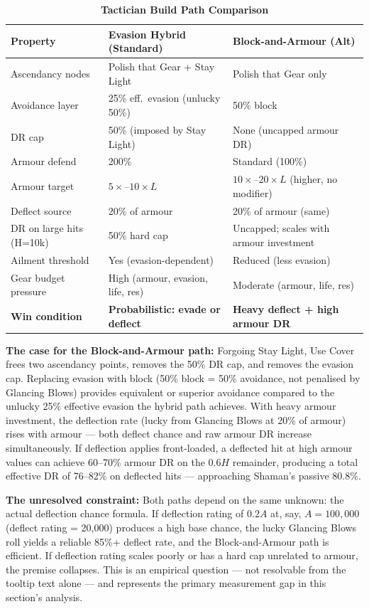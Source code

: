 \documentclass[12pt, letterpaper]{article}
\begin{document}
\begin{table}[htbp]
\centering
\caption{\textbf{Tactician Build Path Comparison}}
\begin{tabular}{lll}
\toprule
\textbf{Property} & \textbf{Evasion Hybrid (Standard)} & \textbf{Block-and-Armour (Alt)} \\
\midrule
\rowcolor{rowalt} Ascendancy nodes & Polish that Gear + Stay Light & Polish that Gear only \\
Avoidance layer & 25\% eff.\ evasion (unlucky 50\%) & 50\% block \\
\rowcolor{rowalt} DR cap & 50\% (imposed by Stay Light) & None (uncapped armour DR) \\
Armour defend & 200\% & Standard (100\%) \\
\rowcolor{rowalt} Armour target & $5\times$--$10\times L$ & $10\times$--$20\times L$ (higher, no modifier) \\
Deflect source & 20\% of armour & 20\% of armour (same) \\
\rowcolor{rowalt} DR on large hits (H=10k) & 50\% hard cap & Uncapped; scales with armour investment \\
Ailment threshold & Yes (evasion-dependent) & Reduced (less evasion) \\
\rowcolor{rowalt} Gear budget pressure & High (armour, evasion, life, res) & Moderate (armour, life, res) \\
\rowcolor{rowhi} \textbf{Win condition} & \textbf{Probabilistic: evade or deflect} & \textbf{Heavy deflect + high armour DR} \\
\bottomrule
\end{tabular}
\end{table}

\textbf{The case for the Block-and-Armour path:} Forgoing Stay Light, Use Cover frees two ascendancy points, removes the 50\% DR cap, and removes the evasion cap. Replacing evasion with block (50\% block = 50\% avoidance, not penalised by Glancing Blows) provides equivalent or superior avoidance compared to the unlucky 25\% effective evasion the hybrid path achieves. With heavy armour investment, the deflection rate (lucky from Glancing Blows at 20\% of armour) rises with armour --- both deflect chance and raw armour DR increase simultaneously. If deflection applies front-loaded, a deflected hit at high armour values can achieve 60--70\% armour DR on the 0.6$H$ remainder, producing a total effective DR of 76--82\% on deflected hits --- approaching Shaman's passive 80.8\%.

\textbf{The unresolved constraint:} Both paths depend on the same unknown: the actual deflection chance formula. If deflection rating of $0.2A$ at, say, $A = 100{,}000$ (deflect rating = 20{,}000) produces a high base chance, the lucky Glancing Blows roll yields a reliable 85\%+ deflect rate, and the Block-and-Armour path is efficient. If deflection rating scales poorly or has a hard cap unrelated to armour, the premise collapses. This is an empirical question --- not resolvable from the tooltip text alone --- and represents the primary measurement gap in this section's analysis.
\end{document}
